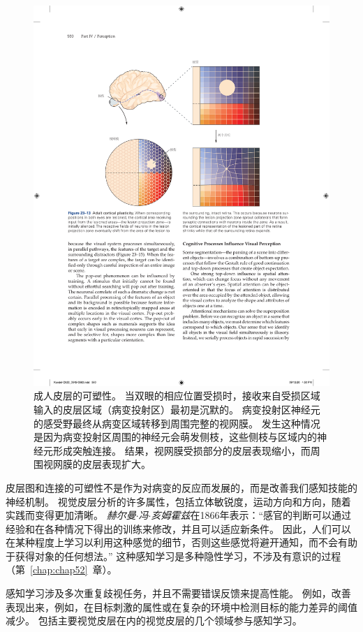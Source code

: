 \begin{figure}[htbp]
	\centering
	\includegraphics[width=0.95\linewidth]{chap23/fig_23_13}
	\caption{成人皮层的可塑性。
		当双眼的相应位置受损时，接收来自受损区域输入的皮层区域（病变投射区）最初是沉默的。
		病变投射区神经元的感受野最终从病变区域转移到周围完整的视网膜。
		发生这种情况是因为病变投射区周围的神经元会萌发侧枝，这些侧枝与区域内的神经元形成突触连接。
		结果，视网膜受损部分的皮层表现缩小，而周围视网膜的皮层表现扩大。}
	\label{fig:23_13}
\end{figure}


皮层图和连接的可塑性不是作为对病变的反应而发展的，而是改善我们感知技能的神经机制。
视觉皮层分析的许多属性，包括立体敏锐度，运动方向和方向，随着实践而变得更加清晰。
\textit{赫尔曼$\cdot$冯$\cdot$亥姆霍兹}在1866年表示：“感官的判断可以通过经验和在各种情况下得出的训练来修改，并且可以适应新条件。
因此，人们可以在某种程度上学习以利用这种感觉的细节，否则这些感觉将避开通知，而不会有助于获得对象的任何想法。” 
这种感知学习是多种隐性学习，不涉及有意识的过程（第~\ref{chap:chap52}~章）。


感知学习涉及多次重复歧视任务，并且不需要错误反馈来提高性能。
例如，改善表现出来，例如，在目标刺激的属性或在复杂的环境中检测目标的能力差异的阈值减少。
包括主要视觉皮层在内的视觉皮层的几个领域参与感知学习。


